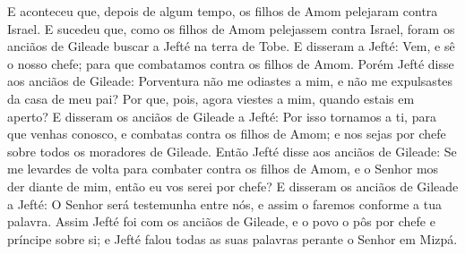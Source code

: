E aconteceu que, depois de algum tempo, os filhos de Amom
pelejaram contra Israel. E sucedeu que, como os filhos de Amom
pelejassem contra Israel, foram os anciãos de Gileade buscar a Jefté
na terra de Tobe. E disseram a Jefté: Vem, e sê o nosso chefe;
para que combatamos contra os filhos de Amom. Porém Jefté disse
aos anciãos de Gileade: Porventura não me odiastes a mim, e não me
expulsastes da casa de meu pai? Por que, pois, agora viestes a mim,
quando estais em aperto? E disseram os anciãos de Gileade a
Jefté: Por isso tornamos a ti, para que venhas conosco, e combatas
contra os filhos de Amom; e nos sejas por chefe sobre todos os
moradores de Gileade. Então Jefté disse aos anciãos de Gileade:
Se me levardes de volta para combater contra os filhos de Amom, e o
Senhor mos der diante de mim, então eu vos serei por chefe? E
disseram os anciãos de Gileade a Jefté: O Senhor será testemunha
entre nós, e assim o faremos conforme a tua palavra. Assim
Jefté foi com os anciãos de Gileade, e o povo o pôs por chefe e
príncipe sobre si; e Jefté falou todas as suas palavras perante o
Senhor em Mizpá.


